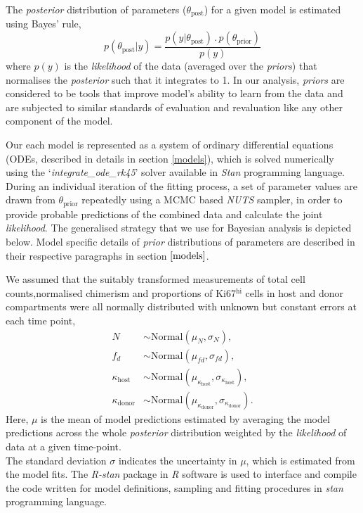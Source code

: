 \documentclass[11pt]{article}
\newcommand{\be}{\begin{equation}}
\newcommand{\ee}{\end{equation}}
\newcommand{\khi}{Ki67$^\text{hi}$}
\begin{document}
The \textit{posterior} distribution of parameters ($\theta_{\text{post}}$) for a given model is estimated using Bayes' rule, 
\be
p(\theta_{\text{post}} | y) = \frac{p(y |\theta_{\text{post}})\, . \, p(\theta_{\text{prior}})}{p(y)} 
\ee
where $p(y)$ is the  \textit{likelihood} of the data (averaged over the \textit{priors}) that normalises the \textit{posterior} such that it integrates to 1. 
In our analysis, \textit{priors} are considered to be tools that improve model's ability to learn from the data and are subjected to similar standards of evaluation and revaluation like any other component of the model.

Our each model is represented as a system of ordinary differential equations (ODEs, described in details in section \ref{models}), which is solved numerically using the `\textit{integrate\_ode\_rk45}' solver available in \textit{Stan} programming language.
During an individual iteration of the fitting  process, a set of parameter values are drawn from $\theta_{\text{prior}}$ repeatedly using a MCMC based \textit{NUTS} sampler, in order to provide probable predictions of the combined data and calculate the joint \textit{likelihood}.   
The generalised strategy that we use for Bayesian analysis is depicted below. Model specific details of \textit{prior} distributions of parameters are described in their respective paragraphs in section $\ref{models}$.

We assumed that the suitably transformed measurements of total cell counts,normalised chimerism and proportions of {\khi} cells in host and donor compartments were all normally distributed with unknown but constant errors at each time point,
\be
\begin{aligned}
N &\sim \text{Normal}(\mu_N, \sigma_N), \\
f_d &\sim \text{Normal}(\mu_{fd}, \sigma_{fd}),\\
\kappa_{\text{host}} &\sim \text{Normal}(\mu_{\kappa_{\text{host}}}, \sigma_{\kappa_{\text{host}}}),\\
\kappa_{\text{donor}} &\sim \text{Normal}(\mu_{\kappa_{\text{donor}}}, \sigma_{\kappa_{\text{donor}}}).
\end{aligned}
\ee
Here, $\mu$ is the mean of model predictions estimated by averaging the model predictions across the whole \textit{posterior} distribution weighted by the \textit{likelihood} of data at a given time-point.\\
The standard deviation $\sigma$ indicates the uncertainty in $\mu$, which is estimated from the model fits. 
The \textit{R-stan} package in \textit{R} software is used to interface and compile the code written for model definitions, sampling and fitting procedures in \textit{stan} programming language. 
\end{document}
